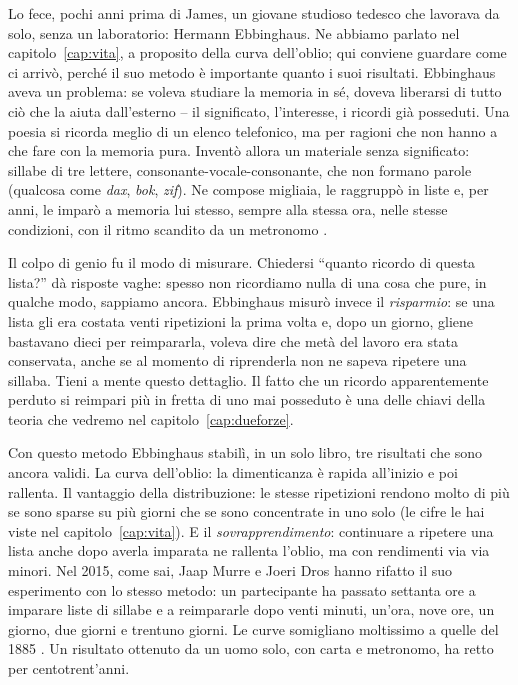Lo fece, pochi anni prima di James, un giovane studioso tedesco che
lavorava da solo, senza un laboratorio: Hermann
Ebbinghaus. Ne abbiamo parlato nel capitolo~\ref{cap:vita}, a proposito
della curva dell'oblio; qui conviene guardare come ci arrivò, perché il
suo metodo è importante quanto i suoi risultati. Ebbinghaus aveva un
problema: se voleva studiare la memoria in sé, doveva liberarsi di
tutto ciò che la aiuta dall'esterno -- il significato, l'interesse, i
ricordi già posseduti. Una poesia si ricorda meglio di un elenco
telefonico, ma per ragioni che non hanno a che fare con la memoria
pura. Inventò allora un materiale senza significato: sillabe di tre
lettere, consonante-vocale-consonante, che non formano parole (qualcosa
come \emph{dax}, \emph{bok}, \emph{zif}). Ne compose migliaia, le
raggruppò in liste e, per anni, le imparò a memoria lui stesso, sempre
alla stessa ora, nelle stesse condizioni, con il ritmo scandito da un
metronomo \parencite{ebbinghaus1885}.

Il colpo di genio fu il modo di misurare. Chiedersi \enquote{quanto
ricordo di questa lista?} dà risposte vaghe: spesso non ricordiamo
nulla di una cosa che pure, in qualche modo, sappiamo ancora. Ebbinghaus
misurò invece il \emph{risparmio}: se una lista gli era costata venti
ripetizioni la prima volta e, dopo un giorno, gliene bastavano dieci per
reimpararla, voleva dire che metà del lavoro era stata conservata,
anche se al momento di riprenderla non ne sapeva ripetere una sillaba.
Tieni a mente questo dettaglio. Il fatto che un ricordo apparentemente
perduto si reimpari più in fretta di uno mai posseduto è una delle
chiavi della teoria che vedremo nel capitolo~\ref{cap:dueforze}.

Con questo metodo Ebbinghaus stabilì, in un solo libro, tre risultati
che sono ancora validi. La curva dell'oblio: la dimenticanza è rapida
all'inizio e poi rallenta. Il vantaggio della distribuzione: le
stesse ripetizioni rendono molto di più se sono sparse su più giorni
che se sono concentrate in uno solo (le cifre le hai viste nel
capitolo~\ref{cap:vita}). E il \emph{sovrapprendimento}: continuare a
ripetere una lista anche dopo averla imparata ne rallenta l'oblio, ma
con rendimenti via via minori. Nel 2015, come sai, Jaap Murre e Joeri
Dros hanno rifatto il suo esperimento con lo stesso metodo: un
partecipante ha passato settanta ore a imparare liste di sillabe e a
reimpararle dopo venti minuti, un'ora, nove ore, un giorno, due giorni
e trentuno giorni. Le curve somigliano moltissimo a quelle del 1885
\parencite{murre2015}. Un risultato ottenuto da un uomo solo, con carta
e metronomo, ha retto per centotrent'anni.

